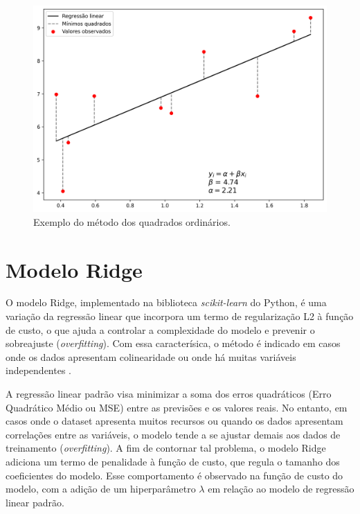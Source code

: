 \begin{figure}[htb]
	\caption{\label{fig:minimos_quadrados}Exemplo do método dos quadrados ordinários.}
	\begin{center}
		\includegraphics[scale=0.6]{figuras/min_sqr.png}
	\end{center}
\end{figure}

\section{Modelo Ridge}

O modelo Ridge, implementado na biblioteca \textit{scikit-learn} do Python, é uma variação da regressão linear que incorpora um termo de regularização L2 à função de custo, o que ajuda a controlar a complexidade do modelo e prevenir o sobreajuste (\textit{overfitting}). Com essa caracterísica, o método é indicado em casos onde os dados apresentam colinearidade ou onde há muitas variáveis independentes \cite{Jolly2018}.

A regressão linear padrão visa minimizar a soma dos erros quadráticos (Erro Quadrático Médio ou MSE) entre as previsões e os valores reais. No entanto, em casos onde o dataset apresenta muitos recursos ou quando os dados apresentam correlações entre as variáveis, o modelo tende a se ajustar demais aos dados de treinamento (\textit{overfitting}). A fim de contornar tal problema, o modelo Ridge adiciona um termo de penalidade à função de custo, que regula o tamanho dos coeficientes do modelo. Esse comportamento é observado na função de custo do modelo, com a adição de um hiperparâmetro $\lambda$ em relação ao modelo de regressão linear padrão.

